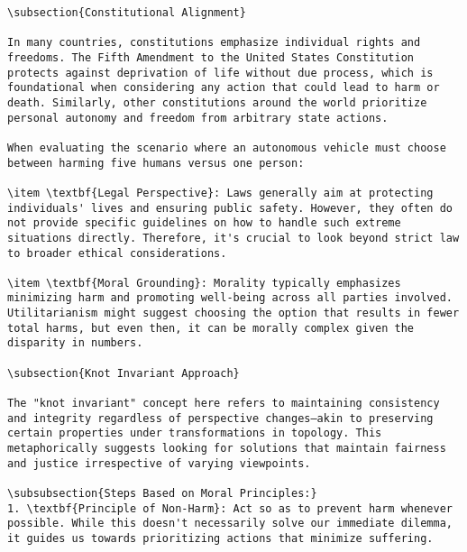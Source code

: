 \documentclass[11pt,a4paper]{article}
\begin{document}
\begin{verbatim}
\subsection{Constitutional Alignment}

In many countries, constitutions emphasize individual rights and freedoms. The Fifth Amendment to the United States Constitution protects against deprivation of life without due process, which is foundational when considering any action that could lead to harm or death. Similarly, other constitutions around the world prioritize personal autonomy and freedom from arbitrary state actions.

When evaluating the scenario where an autonomous vehicle must choose between harming five humans versus one person:

\item \textbf{Legal Perspective}: Laws generally aim at protecting individuals' lives and ensuring public safety. However, they often do not provide specific guidelines on how to handle such extreme situations directly. Therefore, it's crucial to look beyond strict law to broader ethical considerations.

\item \textbf{Moral Grounding}: Morality typically emphasizes minimizing harm and promoting well-being across all parties involved. Utilitarianism might suggest choosing the option that results in fewer total harms, but even then, it can be morally complex given the disparity in numbers.

\subsection{Knot Invariant Approach}

The "knot invariant" concept here refers to maintaining consistency and integrity regardless of perspective changes—akin to preserving certain properties under transformations in topology. This metaphorically suggests looking for solutions that maintain fairness and justice irrespective of varying viewpoints.

\subsubsection{Steps Based on Moral Principles:}
1. \textbf{Principle of Non-Harm}: Act so as to prevent harm whenever possible. While this doesn't necessarily solve our immediate dilemma, it guides us towards prioritizing actions that minimize suffering.


\end{verbatim}
\end{document}
